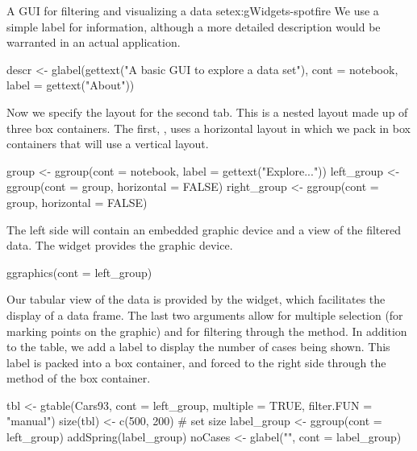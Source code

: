 \begin{example}{A GUI for filtering and visualizing a data set}{ex:gWidgets-spotfire}
We use a simple label for information, although a more detailed
description would be warranted in an actual application.

\begin{Schunk}
\begin{Sinput}
 descr <- glabel(gettext("A basic GUI to explore a data set"), 
                 cont = notebook, label = gettext("About"))
\end{Sinput}
\end{Schunk}
%
Now we specify the layout for the second tab. This is a nested layout
made up of three box containers. The first, , uses a
horizontal layout in which we pack in box containers that will use a
vertical layout.

\begin{Schunk}
\begin{Sinput}
 group <- ggroup(cont = notebook, label = gettext("Explore..."))
 left_group <- ggroup(cont = group, horizontal = FALSE) 
 right_group <- ggroup(cont = group, horizontal = FALSE)
\end{Sinput}
\end{Schunk}

The left side will contain an embedded graphic device and a view of
the filtered data. The  widget provides the
graphic device.
\begin{Schunk}
\begin{Sinput}
 ggraphics(cont = left_group)
\end{Sinput}
\end{Schunk}

Our tabular view of the data is provided by the  widget,
which facilitates the display of a data frame. The last two arguments
allow for multiple selection (for marking points on the graphic) and
for filtering through the  method.
In addition to the table, we add a label to display the number of
cases being shown. This label is packed into a box container, and
forced to the right side through the  method
of the box container.
\begin{Schunk}
\begin{Sinput}
 tbl <- gtable(Cars93, cont = left_group, multiple = TRUE, 
               filter.FUN = "manual")
 size(tbl) <- c(500, 200)                # set size
 label_group <- ggroup(cont = left_group)
 addSpring(label_group)
 noCases <- glabel("", cont = label_group)
\end{Sinput}
\end{Schunk}


\end{example}
